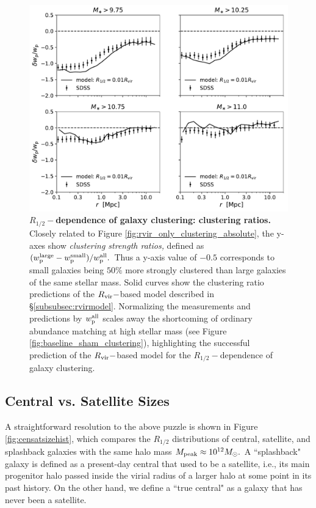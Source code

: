 \documentclass[usenatbib,usegraphicx,letterpaper]{mn2e}
\newcommand{\rhalf}{R_{1/2}}
\newcommand{\mpeak}{M_{\rm peak}}
\newcommand{\rvir}{R_{\rm vir}}
\newcommand{\msun}{M_\odot}
\begin{document}
\begin{figure}
\centering
\includegraphics[width=12cm]{FIGS/rvir_only_wp_ratios.pdf}
\caption{
{\bf $\rhalf-$dependence of galaxy clustering: clustering ratios.}
Closely related to Figure \ref{fig:rvir_only_clustering_absolute}, the y-axes show {\em clustering strength ratios,} defined as $(w_{\rm p}^{\rm large} - w_{\rm p}^{\rm small})/w_{\rm p}^{\rm all}.$ Thus a y-axis value of $-0.5$ corresponds to small galaxies being $50\%$ more strongly clustered than large galaxies of the same stellar mass. Solid curves show the clustering ratio predictions of the $\rvir-$based model described in \S\ref{subsubsec:rvirmodel}. Normalizing the measurements and predictions by $w_{\rm p}^{\rm all}$ scales away the shortcoming of ordinary abundance matching at high stellar mass (see Figure \ref{fig:baseline_sham_clustering}), highlighting the successful prediction of the $\rvir-$based model for the $\rhalf-$dependence of galaxy clustering.
}
\label{fig:clustering_ratio_upshot}
\end{figure}

\subsection{Central vs. Satellite Sizes}
\label{subsec:censat_sizes}

A straightforward resolution to the above puzzle is shown in Figure \ref{fig:censatsizehist}, which compares the $\rhalf$ distributions of central, satellite, and splashback galaxies with the same halo mass $\mpeak\approx10^{12}\msun.$ A ``splashback" galaxy is defined as a present-day central that used to be a satellite, i.e., its main progenitor halo passed inside the virial radius of a larger halo at some point in its past history. On the other hand, we define a ``true central" as a galaxy that has never been a satellite.
\end{document}
